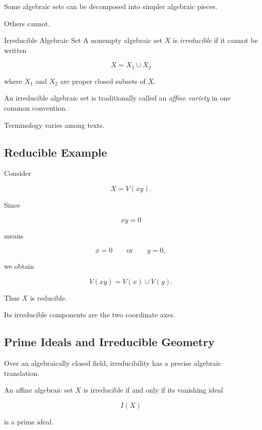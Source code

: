 Some algebraic sets can be decomposed into simpler algebraic pieces.

Others cannot.

\begin{definitionbox}{Irreducible Algebraic Set}
A nonempty algebraic set \(X\) is \emph{irreducible} if it cannot be written

\[
\boxed{
X=X_1\cup X_2
}
\]

where \(X_1\) and \(X_2\) are proper closed subsets of \(X\).
\end{definitionbox}

An irreducible algebraic set is traditionally called an
\emph{affine variety} in one common convention.

Terminology varies among texts.

\subsection{Reducible Example}
\label{subsec:reducible-example}

Consider

\[
X=V(xy).
\]

Since

\[
xy=0
\]

means

\[
x=0
\qquad\text{or}\qquad
y=0,
\]

we obtain

\[
\boxed{
V(xy)=V(x)\cup V(y).
}
\]

Thus \(X\) is reducible.

Its irreducible components are the two coordinate axes.

\subsection{Prime Ideals and Irreducible Geometry}
\label{subsec:prime-ideals-irreducible}

Over an algebraically closed field, irreducibility has a precise algebraic
translation.

\begin{theorem}
An affine algebraic set \(X\) is irreducible if and only if its vanishing
ideal

\[
I(X)
\]

is a prime ideal.
\end{theorem}

